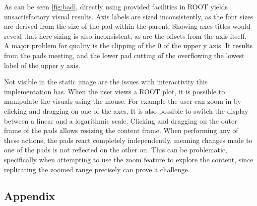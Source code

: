 As can be seen \autoref{fig:bad}, directly using provided facilities in ROOT yields
unsactisfactory visual results. Axis labels are sized inconsistently, as the font sizes
are derived from the size of the pad within the parent. Showing axes titles would reveal
that here sizing is also inconsistent, as are the offsets from the axis itself. A major
problem for quality is the clipping of the 0 of the upper y axis. It results from the pads meeting,
and the lower pad cutting of the overflowing the lowest label of the upper y axis.

Not visible in the static image are the issues with interactivity this implementation has. When the user
views a ROOT plot, it is possible to manipulate the visuals using the mouse. For example 
the user can zoom in by clicking and dragging on one of the axes. It is also possible to switch
the display between a linear and a logarithmic scale. Clicking and dragging on the outer frame of the 
pads allows resizing the content frame. When performing any of these actions, the pads
react completely independently, meaning changes made to one of the pads is not reflected
on the other on. This can be problematic, specifically when attempting to use the zoom
feature to explore the content, since replicating the zoomed range precisely can prove a challenge.


\clearpage

\begin{appendix}
  \section{Appendix}
  \printbibliography
\end{appendix}
